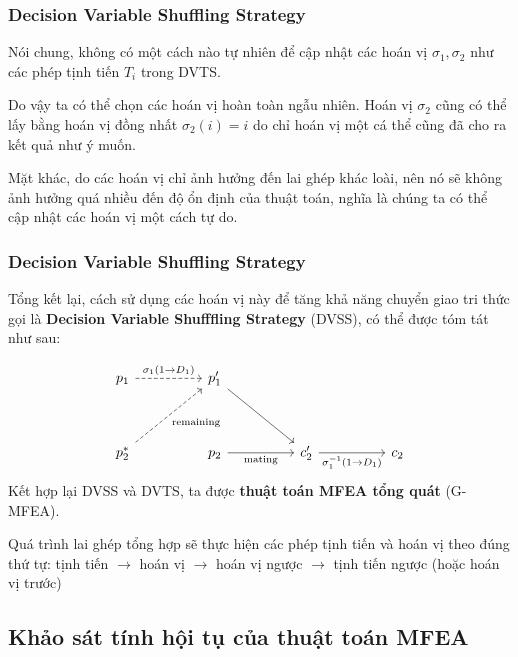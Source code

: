 \begin{frame}[fragile]
\frametitle{Decision Variable Shuffling Strategy}

Nói chung, không có một cách nào tự nhiên để cập nhật các hoán vị \( \sigma_{1},
\sigma_{2} \) như các phép tịnh tiến \( T_{i} \) trong DVTS.

Do vậy ta có thể chọn các hoán vị hoàn toàn ngẫu nhiên. Hoán vị \( \sigma_{2} \)
cũng có thể lấy bằng hoán vị đồng nhất \( \sigma_{2}(i) = i \) do chỉ hoán vị
một cá thể cũng đã cho ra kết quả như ý muốn.

Mặt khác, do các hoán vị chỉ ảnh hưởng đến lai ghép khác loài, nên nó sẽ không
ảnh hưởng quá nhiều đến độ ổn định của thuật toán, nghĩa là chúng ta có thể cập
nhật các hoán vị một cách tự do.
\end{frame}
\begin{frame}
\frametitle{Decision Variable Shuffling Strategy}
Tổng kết lại, cách sử dụng các hoán vị này để tăng khả năng chuyển giao tri thức
gọi là \textbf{Decision Variable Shufffling Strategy} (DVSS), có thể được tóm
tát như sau:

\[\begin{tikzcd}[ampersand replacement=\&]
	{p_1} \&\& {p_1'} \\
	\\
	{p_2^*} \&\& {p_2} \&\& {c'_2} \&\& {c_2}
	\arrow["{\sigma_1(1\to D_1)}", dashed, from=1-1, to=1-3]
	\arrow[from=1-3, to=3-5]
	\arrow["{\text{mating}}"', from=3-3, to=3-5]
	\arrow["{\sigma_1^{-1}(1\to D_1)}"', from=3-5, to=3-7]
	\arrow["{\text{remaining}}"', dashed, from=3-1, to=1-3]
\end{tikzcd}\]
Kết hợp lại DVSS và DVTS, ta được \textbf{thuật toán MFEA tổng quát} (G-MFEA).

Quá trình lai ghép tổng hợp sẽ thực hiện các phép tịnh tiến và hoán vị theo đúng
thứ tự:
tịnh tiến $\to$ hoán vị $\to$ hoán vị ngược $\to$ tịnh tiến ngược (hoặc hoán vị
trước)
\end{frame}


\subsection{Khảo sát tính hội tụ của thuật toán MFEA} %
\label{sub:Khảo sát tính hội tụ của thuật toán MFEA}

